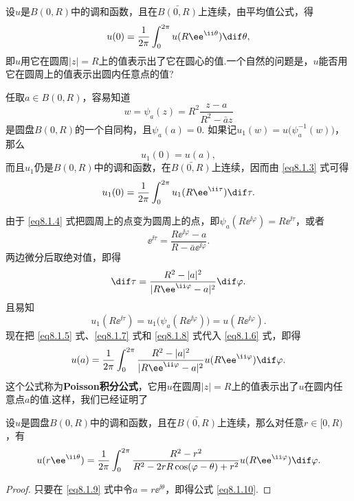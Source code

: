 设$u$是$B(0,R)$中的调和函数，且在$\bar{B(0,R)}$上连续，由平均值公式，得
\begin{equation}\label{eq8.1.3}
u(0)=\frac1{2\pi}\int_0^{2\pi}u(R\ee^{\ii\theta})\dif \theta,
\end{equation}
即$u$用它在圆周$|z|=R$上的值表示出了它在圆心的值.一个自然的问题是，$u$能否用它在圆周上的值表示出圆内任意点的值?

任取$a\in B(0,R)$，容易知道
\begin{equation}\label{eq8.1.4}
w=\psi_a(z)=R^2\frac{z-a}{R^2-\bar az}
\end{equation}
是圆盘$B(0,R)$的一个自同构，且$\psi_a(a)=0$. 如果记$u_1(w)=u\big(\psi_a^{-1}(w)\big)$，那么
\begin{equation}\label{eq8.1.5}
u_1(0)=u(a),
\end{equation}
而且$u_1$仍是$B(0,R)$中的调和函数，在$\bar{B(0,R)}$上连续，因而由 \eqref{eq8.1.3} 式可得
\begin{equation}\label{eq8.1.6}
u_1(0)=\frac1{2\pi}\int_0^{2\pi}u_1(R\ee^{\ii\tau})\dif \tau.
\end{equation}

由于 \eqref{eq8.1.4} 式把圆周上的点变为圆周上的点，即$\psi_a(R\ee^{\ii\varphi})=R\ee^{\ii\tau}$，或者
\[\ee^{\ii\tau}=\frac{R\ee^{\ii\varphi}-a}{R-\bar a\ee^{\ii\varphi}}.\]
两边微分后取绝对值，即得
\begin{equation}\label{eq8.1.7}
\dif \tau=\frac{R^2-|a|^2}{|R\ee^{\ii\varphi}-a|^2}\dif \varphi.
\end{equation}
且易知
\begin{equation}\label{eq8.1.8}
u_1(R\ee^{\ii\tau})=u_1\big(\psi_a(R\ee^{\ii\varphi})\big)=u(R\ee^{\ii\varphi}).
\end{equation}
现在把 \eqref{eq8.1.5} 式、\eqref{eq8.1.7} 式和 \eqref{eq8.1.8} 式代入 \eqref{eq8.1.6} 式，即得
\begin{equation}\label{eq8.1.9}
u(a)=\frac1{2\pi}\int_0^{2\pi}\frac{R^2-|a|^2}{|R\ee^{\ii\varphi}-a|^2}
u(R\ee^{\ii\varphi})\dif \varphi.
\end{equation}
这个公式称为\textbf{Poisson积分公式}，它用$u$在圆周$|z|=R$上的值表示出了$u$在圆内任意点$a$的值.这样，我们已经证明了
\begin{theorem}\label{thm8.1.5}
设$u$是圆盘$B(0,R)$中的调和函数，且在$\bar{B(0,R)}$上连续，那么对任意$r\in[0,R)$，有
\begin{equation}\label{eq8.1.10}
u(r\ee^{\ii\theta})=\frac1{2\pi}\int_0^{2\pi}
\frac{R^2-r^2}{R^2-2rR\cos(\varphi-\theta)+r^2}u(R\ee^{\ii\varphi})\dif \varphi.
\end{equation}
\end{theorem}
\begin{proof}
只要在 \eqref{eq8.1.9} 式中令$a=r\ee^{\ii\theta}$，即得公式 \eqref{eq8.1.10}.
\end{proof}

